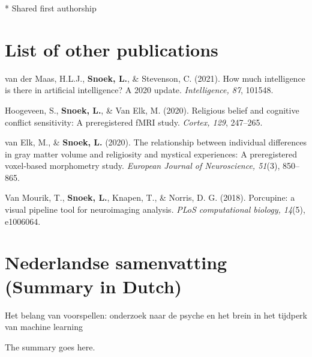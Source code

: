 \documentclass[11pt,american,]{memoir} %
\newenvironment{dutch}[2][]{\begin{otherlanguage}{dutch}}{\end{otherlanguage}}
\begin{document}
* Shared first authorship

\hypertarget{list-of-other-publications}{%
\chapter*{List of other publications}\label{list-of-other-publications}}


van der Maas, H.L.J., \textbf{Snoek, L.}, \& Stevenson, C. (2021). How much intelligence is there in artificial intelligence? A 2020 update. \emph{Intelligence, 87}, 101548.\newline

Hoogeveen, S., \textbf{Snoek, L.}, \& Van Elk, M. (2020). Religious belief and cognitive conflict sensitivity: A preregistered fMRI study. \emph{Cortex, 129}, 247--265.\newline

van Elk, M., \& \textbf{Snoek, L.} (2020). The relationship between individual differences in gray matter volume and religiosity and mystical experiences: A preregistered voxel‐based morphometry study. \emph{European Journal of Neuroscience, 51}(3), 850--865.\newline

Van Mourik, T., \textbf{Snoek, L.}, Knapen, T., \& Norris, D. G. (2018). Porcupine: a visual pipeline tool for neuroimaging analysis. \emph{PLoS computational biology, 14}(5), e1006064.\newline

\normalsize
\setlength{\parindent}{1.5em}

\hypertarget{nederlandse-samenvatting-summary-in-dutch}{%
\chapter*{Nederlandse samenvatting (Summary in Dutch)}\label{nederlandse-samenvatting-summary-in-dutch}}


\begin{dutch}

\emph{Het belang van voorspellen: onderzoek naar de psyche en het brein in het tijdperk van machine learning}

\bigskip

The summary goes here.

\end{dutch}
\end{document}
